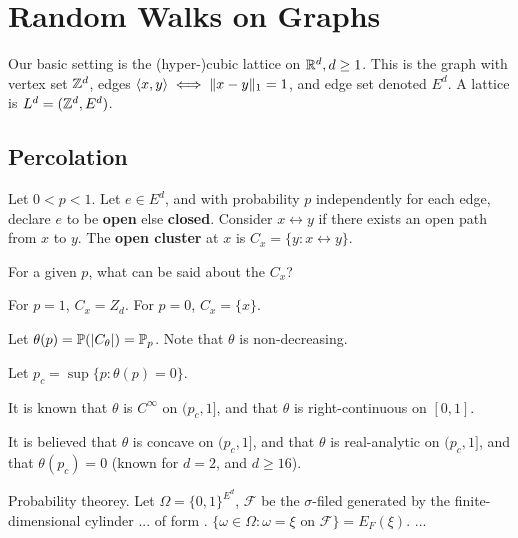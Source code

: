 
\chapter{Random Walks on Graphs}
\label{cha:random-walks-graphs}

Our basic setting is the (hyper-)cubic lattice on $\mathbb{R}^{d}, d \geq 1$.
This is the graph with vertex set $\mathbb{Z}^{d}$, edges $\IP{x, y} \iff \| x
- y \|_{1} = 1$, and edge set denoted $E^{d}$.  A lattice is $L^{d} =
(\mathbb{Z}^{d}, E^{d})$.

\section{Percolation}
\label{sec:percolation}

Let $0 < p < 1$. Let $e \in E^{d}$, and with probability $p$
independently for each edge, declare $e$ to be \textbf{open} else
\textbf{closed}. Consider $x \leftrightarrow y$ if there exists an
open path from $x$ to $y$. The \textbf{open cluster} at $x$ is $C_{x}
= \{ y: x \leftrightarrow y \}$.

\begin{boxthm}
  For a given $p$, what can be said about the $C_{x}$?
\end{boxthm}

For $p = 1$, $C_{x} = Z_{d}$.  For $p = 0$, $C_{x} = \{ x \}$.

\begin{defn}
  \label{defn:random_walks_on_graphs:1}
  Let $\theta(p) = \Prob{|C_{\theta}|} = \Prob_{p}$. Note that
  $\theta$ is non-decreasing.

  Let $p_{c} = \sup \{ p : \theta(p) = 0 \}$.

  It is known that $\theta$ is $C^{\infty}$ on $(p_{c}, 1]$, and that
  $\theta$ is right-continuous on $[0, 1]$.

  It is believed that $\theta$ is concave on $(p_{c}, 1]$, and that
  $\theta$ is real-analytic on $(p_{c}, 1]$, and that $\theta(p_{c}) =
  0$ (known for $d = 2$, and $d \geq 16$).
\end{defn}

\begin{defn}
  \label{defn:random_walks_on_graphs:2}
  Probability theorey.  Let $\Omega = \{ 0, 1\}^{E^{d}}$,
  $\mathcal{F}$ be the $\sigma$-filed generated by the
  finite-dimensional cylinder ... of form .
  $\{ \omega \in \Omega: \omega = \text{$\xi$ on $\mathcal{F}$}\} =
  E_{F}(\xi)$.
  ...
\end{defn}

